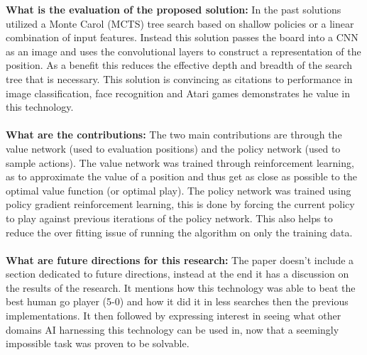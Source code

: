 \documentclass{article}
\begin{document}
\begin{titlepage}
\textbf{What is the evaluation of the proposed solution:} In the past solutions utilized a Monte Carol (MCTS) tree search based on shallow policies or a linear combination of input features. Instead this solution passes the board into a CNN as an image and uses the convolutional layers to construct a representation of the position. As a benefit this reduces the effective depth and breadth of the search tree that is necessary. This solution is convincing as citations to performance in image classification, face recognition and Atari games demonstrates he value in this technology. \\\\

\textbf{What are the contributions:} The two main contributions are through the value network (used to evaluation positions) and the policy network (used to sample actions). The value network was trained through reinforcement learning, as to approximate the value of a position  and thus get as close as possible to the optimal value function (or optimal play). The policy network was trained using policy gradient reinforcement learning, this is done by forcing the current policy to play against previous iterations of the policy network. This also helps to reduce the over fitting issue of running the algorithm on only the training data. \\\\

\textbf{What are future directions for this research:} The paper doesn't include a section dedicated to future directions, instead at the end it has a discussion on the results of the research. It mentions how this technology was able to beat the best human go player (5-0) and how it did it in less searches then the previous implementations. It then followed by expressing interest in seeing what other domains AI harnessing this technology can be used in, now that a seemingly impossible task was proven to be solvable. 
\end{titlepage}
\end{document}

